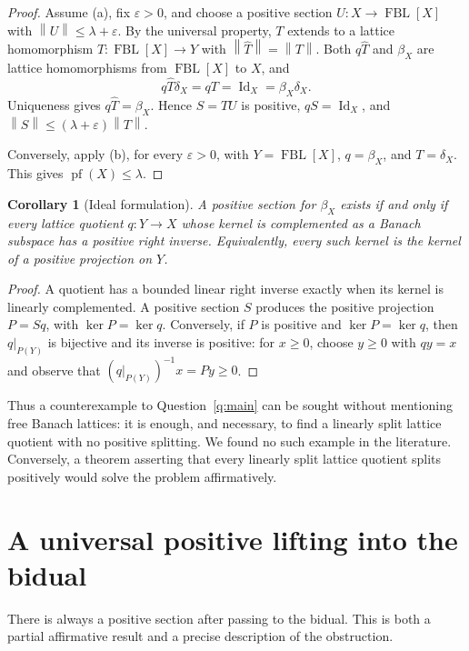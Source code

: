 \documentclass[11pt]{article}
\newtheorem{corollary}[theorem]{Corollary}
\newcommand{\FBL}{\operatorname{FBL}}
\newcommand{\Id}{\operatorname{Id}}
\newcommand{\pf}{\operatorname{pf}}
\newcommand{\norm}[1]{\left\lVert #1\right\rVert}
\begin{document}
\begin{proof}
Assume (a), fix $\varepsilon>0$, and choose a positive section
$U:X\to\FBL[X]$ with $\norm U\leq\lambda+\varepsilon$.  By the universal
property, $T$ extends to a lattice homomorphism
$\widehat T:\FBL[X]\to Y$ with $\norm{\widehat T}=\norm T$.  Both
$q\widehat T$ and $\beta_X$ are lattice homomorphisms from $\FBL[X]$ to $X$,
and
\[
 q\widehat T\delta_X=qT=\Id_X=\beta_X\delta_X.
\]
Uniqueness gives $q\widehat T=\beta_X$.  Hence $S=\widehat TU$ is positive,
$qS=\Id_X$, and $\norm S\leq(\lambda+\varepsilon)\norm T$.

Conversely, apply (b), for every $\varepsilon>0$, with
$Y=\FBL[X]$, $q=\beta_X$, and $T=\delta_X$.  This gives
$\pf(X)\leq\lambda$.
\end{proof}

\begin{corollary}[Ideal formulation]\label{cor:ideal}
A positive section for $\beta_X$ exists if and only if every lattice quotient
$q:Y\to X$ whose kernel is complemented as a Banach subspace has a positive
right inverse.  Equivalently, every such kernel is the kernel of a positive
projection on $Y$.
\end{corollary}

\begin{proof}
A quotient has a bounded linear right inverse exactly when its kernel is
linearly complemented.  A positive section $S$ produces the positive
projection $P=Sq$, with $\ker P=\ker q$.  Conversely, if $P$ is positive and
$\ker P=\ker q$, then $q|_{P(Y)}$ is bijective and its inverse is positive:
for $x\geq0$, choose $y\geq0$ with $qy=x$ and observe that
$(q|_{P(Y)})^{-1}x=Py\geq0$.
\end{proof}

Thus a counterexample to Question~\ref{q:main} can be sought without mentioning free
Banach lattices: it is enough, and necessary, to find a linearly split lattice
quotient with no positive splitting.  We found no such example in the
literature.  Conversely, a theorem asserting that every linearly split lattice
quotient splits positively would solve the problem affirmatively.

\section{A universal positive lifting into the bidual}

There is always a positive section after passing to the bidual.  This is both a
partial affirmative result and a precise description of the obstruction.
\end{document}

